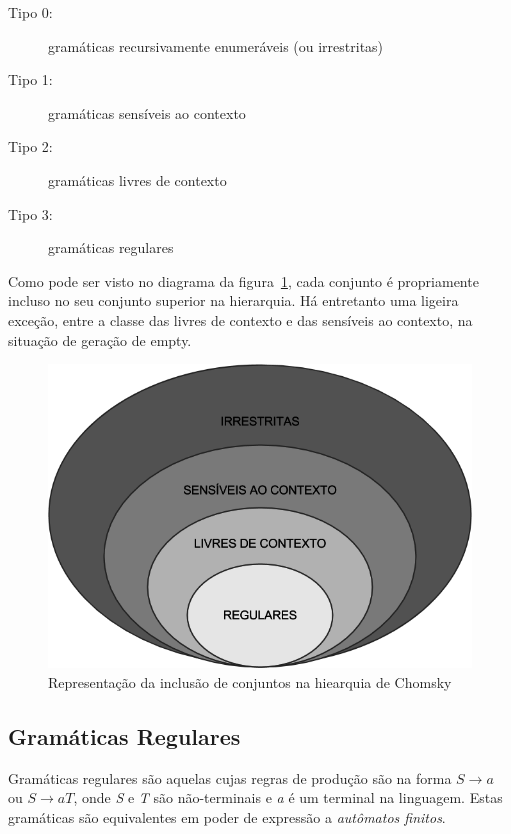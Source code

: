 \documentclass[a4paper,12pt,oneside,onecolumn]{uerj}
\begin{document}
\begin{description}
    \item[Tipo 0:] gramáticas recursivamente enumeráveis (ou irrestritas)
    \item[Tipo 1:] gramáticas sensíveis ao contexto
    \item[Tipo 2:] gramáticas livres de contexto
    \item[Tipo 3:] gramáticas regulares
\end{description}

Como pode ser visto no diagrama da figura~\ref{fig:chomsky}, cada conjunto é propriamente incluso no seu conjunto superior na hierarquia. Há entretanto uma ligeira exceção, entre a classe das livres de contexto e das sensíveis ao contexto, na situação de geração de empty.

\begin{figure}[!htbp]
  \centering
  \includegraphics[scale=0.5]{figures/chomsky.png}
  \caption{Representação da inclusão de conjuntos na hiearquia de Chomsky}
  \label{fig:chomsky}
\end{figure}

\subsection{Gramáticas Regulares}

Gramáticas regulares são aquelas cujas regras de produção são na forma $S \rightarrow a$ ou $S \rightarrow aT$, onde \emph{S} e \emph{T} são não-terminais e \emph{a} é um terminal na linguagem. Estas gramáticas são equivalentes em poder de expressão a \emph{autômatos finitos}. 
\end{document}

